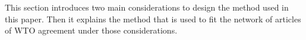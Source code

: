 This section introduces two main considerations to design the method used in this paper.
Then it explains the method that is used to fit the network of articles of WTO agreement under those considerations.
